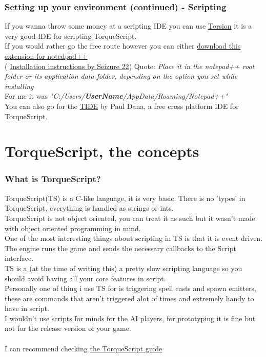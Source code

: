 \begin{frame}
\frametitle{Setting up your environment (continued) - Scripting}
If you wanna throw some money at a scripting IDE you can use {\color{blue} \href{http://garagegames.com/products/torsion}{Torsion}} it is a very good IDE for scripting TorqueScript.\\
If you would rather go the free route however you can either {\color{blue} \href{http://localhostr.com/file/DxuXHBL/userDefineLang.xml}{download this extension for notedpad++}}\\
({\color{blue} \href{http://marbleblast.com/index.cgi?board=mbdkcode&action=display&thread=11959}{Installation instructions by Seizure 22}}) Quote: {\it Place it in the notepad++ root folder or its application data folder, depending on the option you set while installing}\\
For me it was {\it "C:/Users/{\bf UserName}/AppData/Roaming/Notepad++"}\\
You can also go for the {\color{blue} \href{http://torqueide.sourceforge.net}{TIDE}} by Paul Dana, a free cross platform IDE for TorqueScript.
\end{frame}

\section{TorqueScript, the concepts}
\begin{frame}
	\frametitle{What is TorqueScript?}
	TorqueScript(TS) is a C-like language, it is very basic. There is no 'types' in TorqueScript, everything is handled as strings or ints.\\
	TorqueScript is not object oriented, you can treat it as such but it wasn't made with object oriented programming in mind.\\
	One of the most interesting things about scripting in TS is that it is event driven. The engine runs the game and sends the necessary callbacks to the Script interface.\\
	TS is a (at the time of writing this) a pretty slow scripting language so you should avoid having all your core features in script.\\
	Personally one of thing i use TS for is triggering spell casts and spawn emitters, these are commands that aren't triggered alot of times and extremely handy to have in script.\\
	I wouldn't use scripts for minds for the AI players, for prototyping it is fine but not for the release version of your game.\\
	\\
	I can recommend checking {\color{blue} \href{http://garagegames.com/products/torque-3d/guides}{the TorqueScript guide}}
\end{frame}

